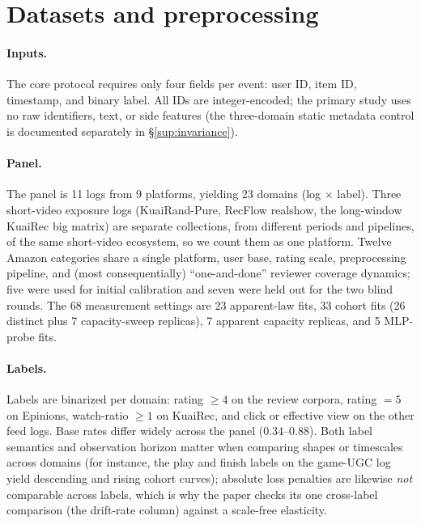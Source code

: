 \documentclass[10pt,letterpaper]{article}
\begin{document}
\section{Datasets and preprocessing}
\label{sup:data}

\paragraph{Inputs.}
The core protocol requires only four fields per event: user ID, item ID,
timestamp, and binary label. All IDs are integer-encoded; the primary study
uses no raw identifiers, text, or side features (the three-domain static
metadata control is documented separately in \S\ref{sup:invariance}).

\paragraph{Panel.}
The panel is 11 logs from 9 platforms, yielding 23 domains
(log $\times$ label). Three short-video exposure logs (KuaiRand-Pure,
RecFlow realshow, the long-window KuaiRec big matrix) are separate
collections, from different periods and pipelines, of the same short-video
ecosystem, so we count them as one platform. Twelve Amazon categories share
a single platform, user base, rating scale, preprocessing pipeline,
and (most consequentially) ``one-and-done'' reviewer coverage
dynamics; five were used for initial calibration and seven were
held out for the two blind rounds. The 68 measurement settings are 23
apparent-law fits, 33 cohort fits (26 distinct plus 7 capacity-sweep
replicas), 7 apparent capacity replicas, and 5 MLP-probe fits.

\paragraph{Labels.}
Labels are binarized per domain: rating $\ge 4$ on the review corpora,
rating $= 5$ on Epinions, watch-ratio $\ge 1$ on KuaiRec, and click or
effective view on the other feed logs. Base rates differ widely across the
panel ($0.34$--$0.88$). Both label semantics and observation horizon matter
when comparing shapes or timescales across domains (for instance, the play
and finish labels on the game-UGC log yield descending and rising cohort
curves); absolute loss penalties are likewise \emph{not} comparable across
labels, which is why the paper checks its one cross-label comparison (the
drift-rate column) against a scale-free elasticity.
\end{document}
